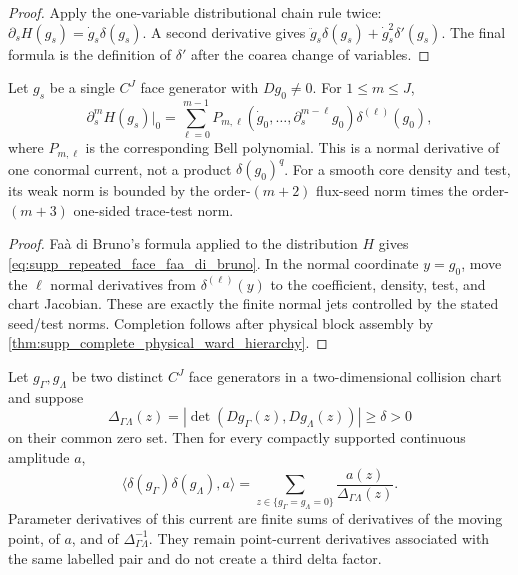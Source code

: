 \begin{proof}
Apply the one-variable distributional chain rule twice:
\(\partial_sH(g_s)=\dot g_s\delta(g_s)\).  A second derivative gives
\(\ddot g_s\delta(g_s)+\dot g_s^2\delta'(g_s)\).  The final formula is the
definition of \(\delta'\) after the coarea change of variables.
\end{proof}

\begin{lemma}
\label{lem:supp_repeated_generator_trace_derivatives}
Let \(g_s\) be a single \(C^J\) face generator with \(Dg_0\ne0\).  For
\(1\le m\le J\),
\begin{equation}
\label{eq:supp_repeated_face_faa_di_bruno}
  \partial_s^mH(g_s)|_0
  =
  \sum_{\ell=0}^{m-1}
  P_{m,\ell}(\dot g_0,\ldots,\partial_s^{m-\ell}g_0)
  \delta^{(\ell)}(g_0),
\end{equation}
where \(P_{m,\ell}\) is the corresponding Bell polynomial.  This is a normal
derivative of one conormal current, not a product
\(\delta(g_0)^q\).  For a smooth core density and test, its weak norm is
bounded by the order-\((m+2)\) flux-seed norm times the order-\((m+3)\)
one-sided trace-test norm.
\end{lemma}

\begin{proof}
Faà di Bruno's formula applied to the distribution \(H\) gives
\eqref{eq:supp_repeated_face_faa_di_bruno}.  In the normal coordinate
\(y=g_0\), move the \(\ell\) normal derivatives from
\(\delta^{(\ell)}(y)\) to the coefficient, density, test, and chart
Jacobian.  These are exactly the finite normal jets controlled by the stated
seed/test norms.  Completion follows after physical block assembly by
\cref{thm:supp_complete_physical_ward_hierarchy}.
\end{proof}

\begin{lemma}
\label{lem:supp_worked_double_trace_coarea}
Let \(g_\Gamma,g_\Lambda\) be two distinct \(C^J\) face generators in a
two-dimensional collision chart and suppose
\[
  \Delta_{\Gamma\Lambda}(z)
  =|\det(Dg_\Gamma(z),Dg_\Lambda(z))|
  \ge\delta>0
\]
on their common zero set.  Then for every compactly supported continuous
amplitude \(a\),
\begin{equation}
\label{eq:supp_clean_double_trace}
  \langle\delta(g_\Gamma)\delta(g_\Lambda),a\rangle
  =
  \sum_{z\in\{g_\Gamma=g_\Lambda=0\}}
  \frac{a(z)}{\Delta_{\Gamma\Lambda}(z)} .
\end{equation}
Parameter derivatives of this current are finite sums of derivatives of the
moving point, of \(a\), and of \(\Delta_{\Gamma\Lambda}^{-1}\).  They remain
point-current derivatives associated with the same labelled pair and do not
create a third delta factor.
\end{lemma}

